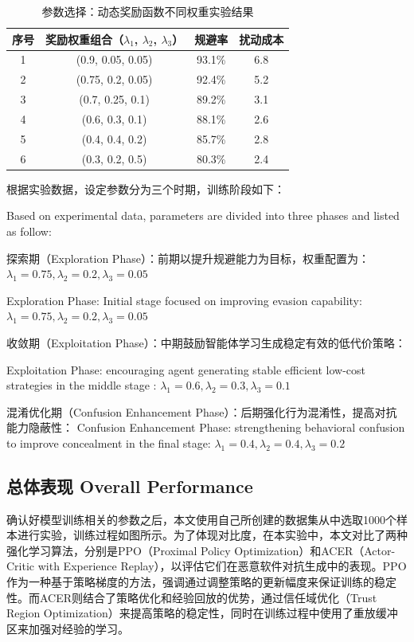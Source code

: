 \renewcommand{\arraystretch}{1.3}
\begin{table}[htbp]
	\centering
	\caption{参数选择：动态奖励函数不同权重实验结果}
	\label{tab:5.8}
	\begin{tabular*}{0.9\textwidth}{@{\extracolsep{\fill}}cccc}
		\toprule
		序号 & 奖励权重组合（$\lambda_1$, $\lambda_2$, $\lambda_3$） & 规避率 & 扰动成本 \\
		\midrule
		1 & (0.9, 0.05, 0.05) & 93.1\% & 6.8 \\
		2 & (0.75, 0.2, 0.05) & 92.4\% & 5.2 \\
		3 & (0.7, 0.25, 0.1) & 89.2\% & 3.1 \\
		4 & (0.6, 0.3, 0.1) & 88.1\% & 2.6 \\
		5 & (0.4, 0.4, 0.2) & 85.7\% & 2.8 \\
		6 & (0.3, 0.2, 0.5) & 80.3\% & 2.4 \\
		\bottomrule
	\end{tabular*}
\end{table}

根据实验数据，设定参数分为三个时期，训练阶段如下：

Based on experimental data, parameters are divided into three phases and listed as follow:

探索期（Exploration Phase）：前期以提升规避能力为目标，权重配置为：$\lambda_1= 0.75, \lambda_2 = 0.2, \lambda_3=0.05$

Exploration Phase: Initial stage focused on improving evasion capability:$\lambda_1= 0.75, \lambda_2 = 0.2, \lambda_3=0.05$

收敛期（Exploitation Phase）：中期鼓励智能体学习生成稳定有效的低代价策略：

Exploitation Phase: encouraging agent generating stable efficient low-cost strategies in the middle stage :
$\lambda_1= 0.6, \lambda_2 = 0.3, \lambda_3=0.1$

混淆优化期（Confusion Enhancement Phase）：后期强化行为混淆性，提高对抗能力隐蔽性：
Confusion Enhancement Phase:  strengthening behavioral confusion to improve concealment in the final stage:
$\lambda_1= 0.4, \lambda_2 = 0.4, \lambda_3=0.2$

\subsection{总体表现 Overall Performance}

确认好模型训练相关的参数之后，本文使用自己所创建的数据集从中选取1000个样本进行实验，训练过程如图所示。为了体现对比度，在本实验中，本文对比了两种强化学习算法，分别是PPO（Proximal Policy Optimization）和ACER\cite{wang2016sample}（Actor-Critic with Experience Replay），以评估它们在恶意软件对抗生成中的表现。PPO作为一种基于策略梯度的方法，强调通过调整策略的更新幅度来保证训练的稳定性。而ACER则结合了策略优化和经验回放的优势，通过信任域优化（Trust Region Optimization）来提高策略的稳定性，同时在训练过程中使用了重放缓冲区来加强对经验的学习。

